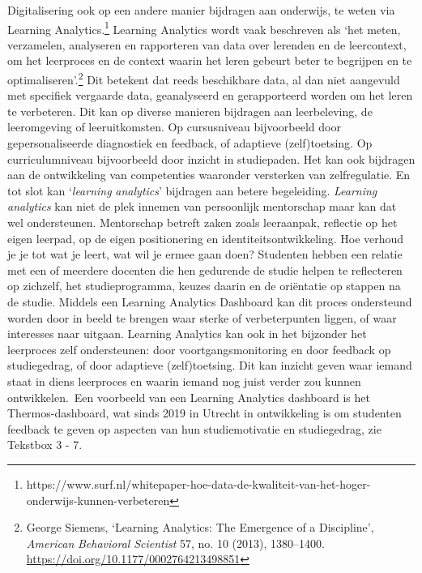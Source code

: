 \documentclass[smallauthor, chapterhaspagenum, nochapterinheader, pagenuminheader,  bigchapnum,medium2, tocpages,  garamond, titleinheader]{jote-book}
\begin{document}
	Digitalisering ook op een andere manier bijdragen aan onderwijs, te weten via Learning Analytics.\footnote{https://www.surf.nl/whitepaper-hoe-data-de-kwaliteit-van-het-hoger-onderwijs-kunnen-verbeteren} Learning Analytics wordt vaak beschreven als ‘het meten, verzamelen, analyseren en rapporteren van data over lerenden en de leercontext, om het leerproces en de context waarin het leren gebeurt beter te begrijpen en te optimaliseren'.\footnote{George Siemens, ‘Learning Analytics: The Emergence of a Discipline', \emph{American }\emph{Behavioral}\emph{ }\emph{Scientist}\emph{ }57, no. 10 (2013), 1380--1400. \href{https://doi.org/10.1177/0002764213498851}{https://doi.org/10.1177/0002764213498851}} Dit betekent dat reeds beschikbare data, al dan niet aangevuld met specifiek vergaarde data, geanalyseerd en gerapporteerd worden om het leren te verbeteren. Dit kan op diverse manieren bijdragen aan leerbeleving, de leeromgeving of leeruitkomsten. Op cursusniveau bijvoorbeeld door gepersonaliseerde diagnostiek en feedback, of adaptieve (zelf)toetsing. Op curriculumniveau bijvoorbeeld door inzicht in studiepaden. Het kan ook bijdragen aan de ontwikkeling van competenties waaronder versterken van zelfregulatie. En tot slot kan ‘\emph{learning}\emph{ }\emph{analytics}' bijdragen aan betere begeleiding. \emph{Learning }\emph{analytics} kan niet de plek innemen van persoonlijk mentorschap maar kan dat wel ondersteunen. Mentorschap betreft zaken zoals leeraanpak, reflectie op het eigen leerpad, op de eigen positionering en identiteitsontwikkeling. Hoe verhoud je je tot wat je leert, wat wil je ermee gaan doen? Studenten hebben een relatie met een of meerdere docenten die hen gedurende de studie helpen te reflecteren op zichzelf, het studieprogramma, keuzes daarin en de oriëntatie op stappen na de studie. Middels een Learning Analytics Dashboard kan dit proces ondersteund worden door in beeld te brengen waar sterke of verbeterpunten liggen, of waar interesses naar uitgaan. Learning Analytics kan ook in het bijzonder het leerproces zelf ondersteunen: door voortgangsmonitoring en door feedback op studiegedrag, of door adaptieve (zelf)toetsing. Dit kan inzicht geven waar iemand staat in diens leerproces en waarin iemand nog juist verder zou kunnen ontwikkelen. Een voorbeeld van een Learning Analytics dashboard is het Thermos-dashboard, wat sinds 2019 in Utrecht in ontwikkeling is om studenten feedback te geven op aspecten van hun studiemotivatie en studiegedrag, zie Tekstbox 3 - 7.
\end{document}
